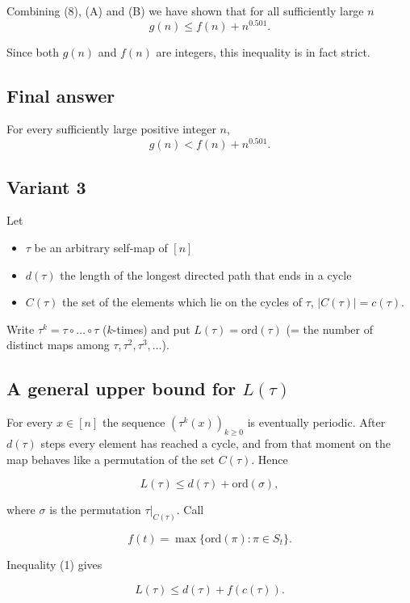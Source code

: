 \documentclass[12pt,a4paper]{article}
\theoremstyle{definition}
\begin{document}
    Combining (8), (A) and (B) we have shown that for all sufficiently large $n$
    $$g(n) \leq f(n) + n^{0.501}.$$

    Since both $g(n)$ and $f(n)$ are integers, this inequality is in fact strict.

    \subsection*{Final answer}
    For every sufficiently large positive integer $n$,
    $$g(n) < f(n) + n^{0.501}.$$


    \subsection{Variant 3}
    Let
    \begin{itemize}
        \item $\tau$ be an arbitrary self-map of $[n]$
        \item $d(\tau)$ the length of the longest directed path that ends in a cycle
        \item $C(\tau)$ the set of the elements which lie on the cycles of $\tau$, $|C(\tau)| = c(\tau)$.
    \end{itemize}

    Write $\tau^k = \tau \circ \ldots \circ \tau$ ($k$-times) and put
    $L(\tau) = \text{ord}(\tau)$ (= the number of distinct maps among $\tau, \tau^2, \tau^3, \ldots$).

    \subsection*{A general upper bound for $L(\tau)$}

    For every $x \in [n]$ the sequence $(\tau^k(x))_{k \geq 0}$ is eventually periodic.
    After $d(\tau)$ steps every element has reached a cycle, and from that
    moment on the map behaves like a permutation of the set $C(\tau)$. Hence

    \begin{equation}
        L(\tau) \leq d(\tau) + \text{ord}(\sigma),
    \end{equation}

    where $\sigma$ is the permutation $\tau|_{C(\tau)}$.
    Call

    $$f(t) = \max\{ \text{ord}(\pi) : \pi \in S_t \}.$$

    Inequality (1) gives

    \begin{equation}
        L(\tau) \leq d(\tau) + f(c(\tau)).
    \end{equation}
\end{document}

